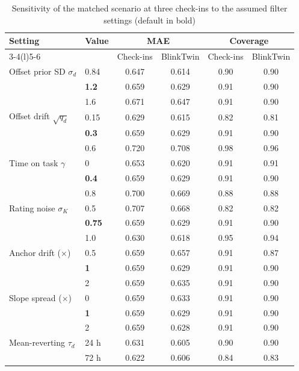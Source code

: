 \begin{table}[h]
  \centering
  \caption{Sensitivity of the matched scenario at three check-ins to the assumed filter settings (default in bold)}
  \label{tab:appsensitivity}
  \footnotesize
  \setlength{\tabcolsep}{2pt}
  \begin{tabular}{@{}llcccc@{}}
    \toprule
    Setting & Value & \multicolumn{2}{c}{MAE} & \multicolumn{2}{c}{Coverage} \\
    \cmidrule(lr){3-4}\cmidrule(l){5-6}
    & & Check-ins & BlinkTwin & Check-ins & BlinkTwin \\
    \midrule
    Offset prior SD $\sigma_d$ & 0.84 & 0.647 & 0.614 & 0.90 & 0.90 \\
     & \textbf{1.2} & 0.659 & 0.629 & 0.91 & 0.90 \\
     & 1.6 & 0.671 & 0.647 & 0.91 & 0.90 \\
    Offset drift $\sqrt{q_d}$ & 0.15 & 0.629 & 0.615 & 0.82 & 0.81 \\
     & \textbf{0.3} & 0.659 & 0.629 & 0.91 & 0.90 \\
     & 0.6 & 0.720 & 0.708 & 0.98 & 0.96 \\
    Time on task $\gamma$ & 0 & 0.653 & 0.620 & 0.91 & 0.91 \\
     & \textbf{0.4} & 0.659 & 0.629 & 0.91 & 0.90 \\
     & 0.8 & 0.700 & 0.669 & 0.88 & 0.88 \\
    Rating noise $\sigma_K$ & 0.5 & 0.707 & 0.668 & 0.82 & 0.82 \\
     & \textbf{0.75} & 0.659 & 0.629 & 0.91 & 0.90 \\
     & 1.0 & 0.630 & 0.618 & 0.95 & 0.94 \\
    Anchor drift ($\times$) & 0.5 & 0.659 & 0.657 & 0.91 & 0.87 \\
     & \textbf{1} & 0.659 & 0.629 & 0.91 & 0.90 \\
     & 2 & 0.659 & 0.635 & 0.91 & 0.90 \\
    Slope spread ($\times$) & 0 & 0.659 & 0.633 & 0.91 & 0.90 \\
     & \textbf{1} & 0.659 & 0.629 & 0.91 & 0.90 \\
     & 2 & 0.659 & 0.628 & 0.91 & 0.90 \\
    Mean-reverting $\tau_d$ & 24 h & 0.631 & 0.605 & 0.90 & 0.90 \\
     & 72 h & 0.622 & 0.606 & 0.84 & 0.83 \\
    \bottomrule
  \end{tabular}
\end{table}

